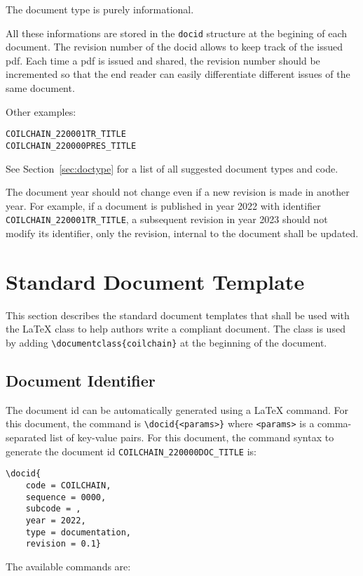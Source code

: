 \documentclass[technicalreport]{coilchain}
\begin{document}
The document type is purely informational.

All these informations are stored in the \texttt{docid} structure at the begining of each document. The revision number of the docid allows to keep track of the issued pdf. Each time a pdf is issued and shared, the revision number should be incremented so that the end reader can easily differentiate different issues of the same document.

Other examples:

\begin{center}
	\texttt{COILCHAIN\_220001TR\_TITLE}\\
	\texttt{COILCHAIN\_220000PRES\_TITLE}\\
\end{center}

See Section~\ref{sec:doctype} for a list of all suggested document types and 
code.

The document year should not change even if a new revision is made in another 
year. For example, if a document is published in year 2022 with identifier 
\texttt{COILCHAIN\_220001TR\_TITLE}, a subsequent revision in year 2023 should not modify its identifier, only the revision, internal to the document shall be updated.

\section{Standard Document Template}
This section describes the standard document templates that shall be used with 
the \LaTeX{} class to help authors write a compliant document. The 
class is used by adding \verb|\documentclass{coilchain}| at the beginning of 
the document.

\subsection{Document Identifier}\label{sec:docid}
The document id can be automatically generated using a \LaTeX{} command. For 
this document, the command is \verb|\docid{<params>}| where \verb|<params>| is 
a comma-separated list of key-value pairs. For this document, the command 
syntax to generate the document id \texttt{COILCHAIN\_220000DOC\_TITLE} is:
\begin{verbatim}
\docid{
	code = COILCHAIN,
	sequence = 0000,
	subcode = ,
	year = 2022,
	type = documentation,
	revision = 0.1}
\end{verbatim}

The available commands are:
\end{document}
